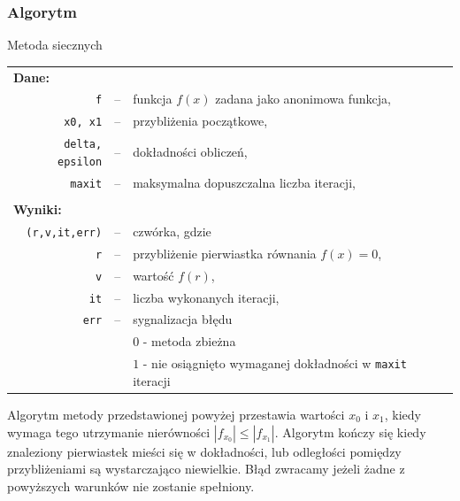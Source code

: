 \documentclass[10pt,a4paper, polish]{article}
\begin{document}
\subsubsection*{Algorytm}
\begin{algorithm}[H]
\caption{Metoda siecznych}
\label{alg:sie}
\DontPrintSemicolon
{}
\end{algorithm}
\begin{longtable}[l]{r  c  l}
\multicolumn{1}{l}{\textbf{Dane:}}&& \\
\texttt{f}&--&funkcja $f(x)$ zadana jako anonimowa funkcja, \\
\texttt{x0, x1}&--&przybliżenia początkowe, \\
\texttt{delta, epsilon}&--&dokładności obliczeń, \\
\texttt{maxit}&--&maksymalna dopuszczalna liczba iteracji, \\
&& \\
\multicolumn{1}{l}{\textbf{Wyniki:}}&& \\
\texttt{(r,v,it,err)}&--&czwórka, gdzie \\
\texttt{r}&--&przybliżenie pierwiastka równania $f(x) = 0$, \\
\texttt{v}&--&wartość $f(r)$, \\
\texttt{it}&--&liczba wykonanych iteracji, \\
\texttt{err}&--&sygnalizacja błędu \\
&&$0$ - metoda zbieżna \\
&&$1$ - nie osiągnięto wymaganej dokładności w \texttt{maxit} iteracji \\
\end{longtable}

Algorytm metody przedstawionej powyżej przestawia wartości $x_0$ i $x_1$, kiedy wymaga tego utrzymanie nierówności $|f_{x_0}| \leq |f_{x_1}|$. Algorytm kończy się kiedy znaleziony pierwiastek mieści się w dokładności, lub odległości pomiędzy przybliżeniami są wystarczająco niewielkie. Błąd zwracamy jeżeli żadne z powyższych warunków nie zostanie spełniony.
\end{document}
